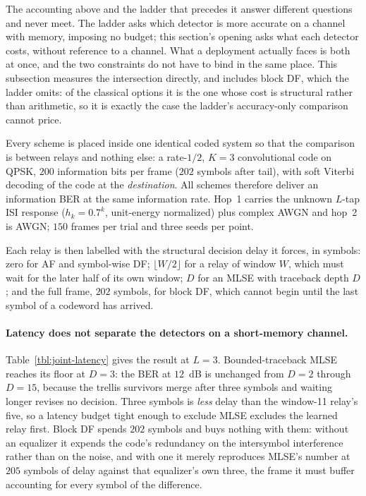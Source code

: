 The accounting above and the ladder that precedes it answer different questions and never meet. The ladder asks which detector is more accurate on a channel with memory, imposing no budget; this section's opening asks what each detector costs, without reference to a channel. What a deployment actually faces is both at once, and the two constraints do not have to bind in the same place. This subsection measures the intersection directly, and includes block DF, which the ladder omits: of the classical options it is the one whose cost is structural rather than arithmetic, so it is exactly the case the ladder's accuracy-only comparison cannot price.

Every scheme is placed inside one identical coded system so that the comparison is between relays and nothing else: a rate-$1/2$, $K=3$ convolutional code on QPSK, $200$ information bits per frame ($202$ symbols after tail), with soft Viterbi decoding of the code at the \emph{destination}. All schemes therefore deliver an information BER at the same information rate. Hop~1 carries the unknown $L$-tap ISI response ($h_k = 0.7^k$, unit-energy normalized) plus complex AWGN and hop~2 is AWGN; $150$ frames per trial and three seeds per point.

Each relay is then labelled with the structural decision delay it forces, in symbols: zero for AF and symbol-wise DF; $\lfloor W/2 \rfloor$ for a relay of window $W$, which must wait for the later half of its own window; $D$ for an MLSE with traceback depth $D$; and the full frame, $202$ symbols, for block DF, which cannot begin until the last symbol of a codeword has arrived.

\paragraph{Latency does not separate the detectors on a short-memory channel.} Table~\ref{tbl:joint-latency} gives the result at $L=3$. Bounded-traceback MLSE reaches its floor at $D=3$: the BER at $12$~dB is unchanged from $D=2$ through $D=15$, because the trellis survivors merge after three symbols and waiting longer revises no decision. Three symbols is \emph{less} delay than the window-11 relay's five, so a latency budget tight enough to exclude MLSE excludes the learned relay first. Block DF spends $202$ symbols and buys nothing with them: without an equalizer it expends the code's redundancy on the intersymbol interference rather than on the noise, and with one it merely reproduces MLSE's number at $205$ symbols of delay against that equalizer's own three, the frame it must buffer accounting for every symbol of the difference.

